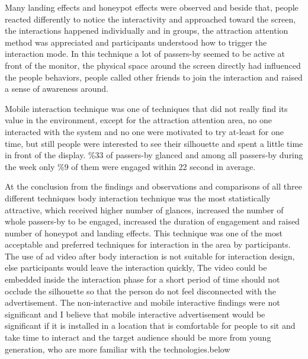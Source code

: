 Many landing effects and honeypot effects were observed and beside that, people reacted differently to notice the interactivity and approached toward the screen, the interactions happened individually and in groups, the attraction attention method was appreciated and participants understood how to trigger the interaction mode. In this technique a lot of passers-by seemed to be active at front of the monitor, the physical space around the screen directly had influenced the people behaviors, people called other friends to join the interaction and raised a sense of awareness around. 

Mobile interaction technique was one of techniques that did not really find its value in the environment, except for the attraction attention area, no one interacted with the system and no one were motivated to try at-least for one time, but still people were interested to see their silhouette and spent a little time in front of the display. \%33 of passers-by glanced and among all passers-by during the week only \%9 of them were engaged within 22 second in average.

At the conclusion from the findings and observations and comparisons of all three different techniques body interaction technique was the most statistically attractive, which received higher number of glances, increased the number of whole passers-by to be engaged, increased the duration of engagement and raised number of honeypot and landing effects. This technique was one of the most acceptable and preferred techniques for interaction in the area by participants. The use of ad video after body interaction is not suitable for interaction design, else participants would leave the interaction quickly, The video could be embedded inside the interaction phase for a short period of time should not occlude the silhouette so that the person do not feel disconnected with the advertisement. The non-interactive and mobile interactive findings were not significant and I believe that mobile interactive advertisement would be significant if it is installed in a location that is comfortable for people to sit and take time to interact and the target audience should be more from young generation, who are more familiar with the technologies.below
